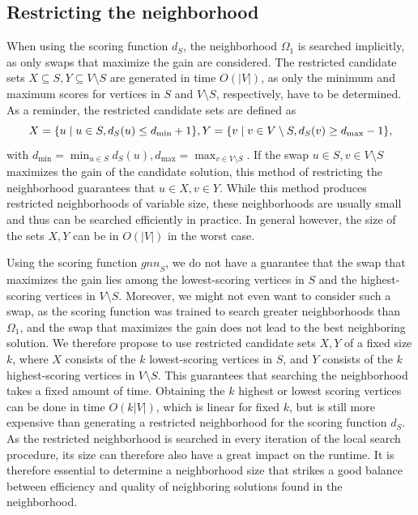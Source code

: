 \documentclass[draft,final]{vutinfth} %
\begin{document}
\subsection{Restricting the neighborhood}
When using the scoring function $d_S$, the neighborhood $\Omega_1$ is searched implicitly, as only swaps that maximize the gain are considered. 
The restricted candidate sets $X \subseteq S, Y \subseteq V \setminus S$ are generated in time $O(|V|)$, as only the minimum and maximum scores for vertices in $S$ and $V \setminus S$, respectively, have to be determined. As a reminder, the restricted candidate sets are defined as 
\[
    X = \{ u \mid u \in S, d_S(u) \leq d_{\min} + 1 \}, \\
    Y = \{ v \mid v \in V \setminus S, d_S(v) \geq d_{\max} - 1 \},
\]
with $d_{\min} = \min_{u \in S} d_S(u), d_{\max} = \max_{v \in V \setminus S}$. 
If the swap $u \in S,v \in V \setminus S$ maximizes the gain of the candidate solution, this method of restricting the neighborhood guarantees that $u \in X, v \in Y$.
While this method produces restricted neighborhoods of variable size, these neighborhoods are usually small and thus can be searched efficiently in practice. In general however, the size of the sets $X, Y$ can be in $O(|V|)$ in the worst case. 

Using the scoring function $\mathit{gnn}_S$, we do not have a guarantee that the swap that maximizes the gain lies among the lowest-scoring vertices in $S$ and the highest-scoring vertices in $V \setminus S$. Moreover, we might not even want to consider such a swap, as the scoring function was trained to search greater neighborhoods than $\Omega_1$, and the swap that maximizes the gain does not lead to the best neighboring solution. We therefore propose to use restricted candidate sets $X,Y$ of a fixed size $k$, where $X$ consists of the $k$ lowest-scoring vertices in $S$, and $Y$ consists of the $k$ highest-scoring vertices in $V \setminus S$. This guarantees that searching the neighborhood takes a fixed amount of time. 
Obtaining the $k$ highest or lowest scoring vertices can be done in time $O(k |V|)$, which is linear for fixed $k$, but is still more expensive than generating a restricted neighborhood for the scoring function $d_S$. As the restricted neighborhood is searched in every iteration of the local search procedure, its size can therefore also have a great impact on the runtime. It is therefore essential to determine a neighborhood size that strikes a good balance between efficiency and quality of neighboring solutions found in the neighborhood.  
\end{document}
